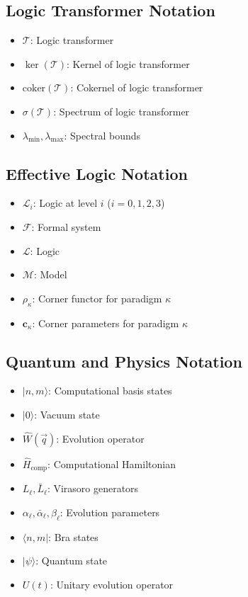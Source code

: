 \subsection{Logic Transformer Notation}
\begin{itemize}
\item $\mathcal{T}$: Logic transformer
\item $\ker(\mathcal{T})$: Kernel of logic transformer
\item $\text{coker}(\mathcal{T})$: Cokernel of logic transformer
\item $\sigma(\mathcal{T})$: Spectrum of logic transformer
\item $\lambda_{\min}, \lambda_{\max}$: Spectral bounds
\end{itemize}

\subsection{Effective Logic Notation}
\begin{itemize}
\item $\mathcal{L}_i$: Logic at level $i$ ($i = 0,1,2,3$)
\item $\mathcal{F}$: Formal system
\item $\mathcal{L}$: Logic
\item $\mathcal{M}$: Model
\item $\rho_\kappa$: Corner functor for paradigm $\kappa$
\item $\mathbf{c}_\kappa$: Corner parameters for paradigm $\kappa$
\end{itemize}

\subsection{Quantum and Physics Notation}
\begin{itemize}
\item $|n,m\rangle$: Computational basis states
\item $|0\rangle$: Vacuum state
\item $\hat{W}(\vec{q})$: Evolution operator
\item $\hat{H}_{\text{comp}}$: Computational Hamiltonian
\item $L_\ell, \bar{L}_\ell$: Virasoro generators
\item $\alpha_\ell, \bar{\alpha}_\ell, \beta_\ell$: Evolution parameters
\item $\langle n,m|$: Bra states
\item $|\psi\rangle$: Quantum state
\item $U(t)$: Unitary evolution operator
\end{itemize}

